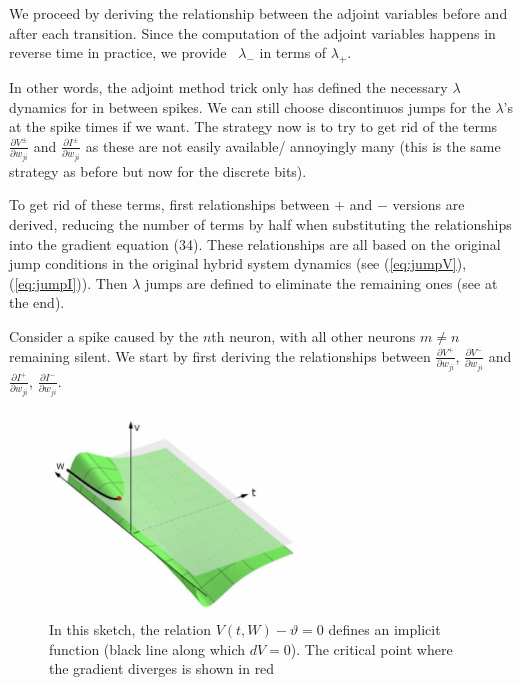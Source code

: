 \documentclass[a4paper]{article}
\newcommand{\blue}[1]{{\color{blue}#1}}
\begin{document}
  \blue{
    We proceed by deriving the relationship between the adjoint variables before and after each transition. Since
    the computation of the adjoint variables happens in reverse time
    in practice, we provide  $\lambda_-$ in terms of $\lambda_+$.
  }

  In other words, the adjoint method trick only has defined the
  necessary $\lambda$ dynamics for in between spikes. We can still choose
  discontinuos jumps for the $\lambda$'s at the spike
  times if we want. The strategy now is to try to get rid of the terms
  $\frac{\partial V^{\pm}}{\partial w_{ji}}$ and $\frac{\partial
    I^{\pm}}{\partial w_{ji}}$ as these are not easily available/
  annoyingly many (this is the same strategy as before but now for the
  discrete bits).

  To get rid of these terms, first relationships
  between $+$ and $-$ versions are derived, reducing the number of
  terms by half when substituting the relationships into the gradient
  equation \blue{(34)}. These relationships are all based on the
  original jump conditions in the original hybrid system dynamics (see
  (\ref{eq:jumpV}), (\ref{eq:jumpI})).
  Then $\lambda$ jumps are defined to eliminate
  the remaining ones (see at the end).

  \blue{
    Consider a spike caused by the $n$th neuron, with all other
    neurons $m \neq n$ remaining silent. We start by first
deriving the relationships between $\frac{\partial V^+}{\partial
  w_{ji}}$, $\frac{\partial V^-}{\partial w_{ji}}$ and
$\frac{\partial I^+}{\partial w_{ji}}$, $\frac{\partial I^-}{\partial w_{ji}}$.
  }

  \begin{figure}
    \includegraphics[width=0.6\textwidth]{figure5.png}
    \caption{\blue{In this sketch, the relation $V(t,W) - \vartheta =
        0$ defines an implicit function (black line along which $dV =
        0$). The critical point where the gradient diverges is shown
        in red}\label{fig1}}
    \end{figure}
  
\end{document}

